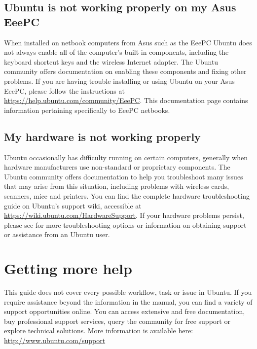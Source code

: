\subsection{Ubuntu is not working properly on my Asus EeePC}

When installed on netbook computers from Asus \dash such as the EeePC \dash Ubuntu does not always enable all of the computer's built-in components, including the keyboard shortcut keys and the wireless Internet adapter. The Ubuntu community offers documentation on enabling these components and fixing other problems. If you are having trouble installing or using Ubuntu on your Asus EeePC, please follow the instructions at \url{https://help.ubuntu.com/community/EeePC}. 
This documentation page contains information pertaining specifically to EeePC netbooks.

\subsection{My hardware is not working properly}

Ubuntu occasionally has difficulty running on certain computers, generally when hardware manufacturers use non-standard or proprietary components. The Ubuntu community offers documentation to help you troubleshoot many issues that may arise from this situation, including problems with wireless cards, scanners, mice and printers. You can find the complete hardware troubleshooting guide on Ubuntu's support wiki, accessible at \url{https://wiki.ubuntu.com/HardwareSupport}. If your hardware problems persist, please see  for more troubleshooting options or information on obtaining support or assistance from an Ubuntu user.

\section{Getting more help}
\label{sec:troubleshooting:getting-more-help}

This guide does not cover every possible workflow, task or issue in Ubuntu.
If you require assistance beyond the information in the manual, you can find a variety of support opportunities online.
You can access extensive and free documentation, buy professional support services, query the community for free support or explore technical solutions.
More information is available here: \url{http://www.ubuntu.com/support}
